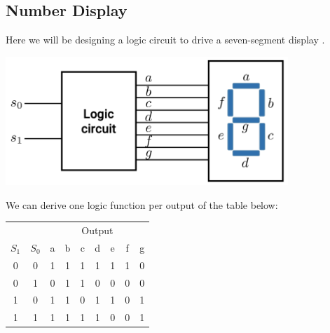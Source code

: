 \documentclass[12pt,openany]{book}
\begin{document}
			      	\subsection{Number Display}
			      	Here we will be designing a logic circuit to drive a seven-segment display .
			      	\begin{center}
			      		\begin{minipage}[c]{0.80\textwidth} %
			      			\centering
			      			\includegraphics[width=0.80\textwidth]{circuits/6.12.1.png} 
			      		\end{minipage}
			      	\end{center}
			      	We can derive one logic function per output of the table below:
			      	\begin{table}[h!]
			      		\centering
			      		\begin{tabular}{|c|c|c|c|c|c|c|c|c|}
			      			\hline
			      			\multicolumn{2}{|c|}{} & \multicolumn{7}{c|}{Output} \\
			      			\hhline{|~|-|-------|}
			      			\( S_1 \) & \( S_0 \) & a & b & c & d & e & f & g \\
			      			\hline
			      			0         & 0         & 1 & 1 & 1 & 1 & 1 & 1 & 0 \\
			      			\hline
			      			0         & 1         & 0 & 1 & 1 & 0 & 0 & 0 & 0 \\
			      			\hline
			      			1         & 0         & 1 & 1 & 0 & 1 & 1 & 0 & 1 \\
			      			\hline
			      			1         & 1         & 1 & 1 & 1 & 1 & 0 & 0 & 1 \\
			      			\hline
			      		\end{tabular}
			      	\end{table}
			      	\vspace{-10px}
\end{document}
